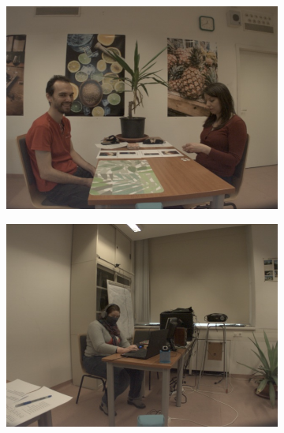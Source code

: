 \begin{figure}
\begin{subfigure}[b]{0.45\linewidth}
        \includegraphics[width=\linewidth]{figures/video_examples/video_example_table_2.png}
    \end{subfigure}
    \begin{subfigure}[b]{0.45\linewidth}
        \includegraphics[width=\linewidth]{figures/video_examples/video_example_mask.png}
    \end{subfigure}
    \begin{subfigure}[b]{0.45\linewidth}

\end{subfigure}
\end{figure}
